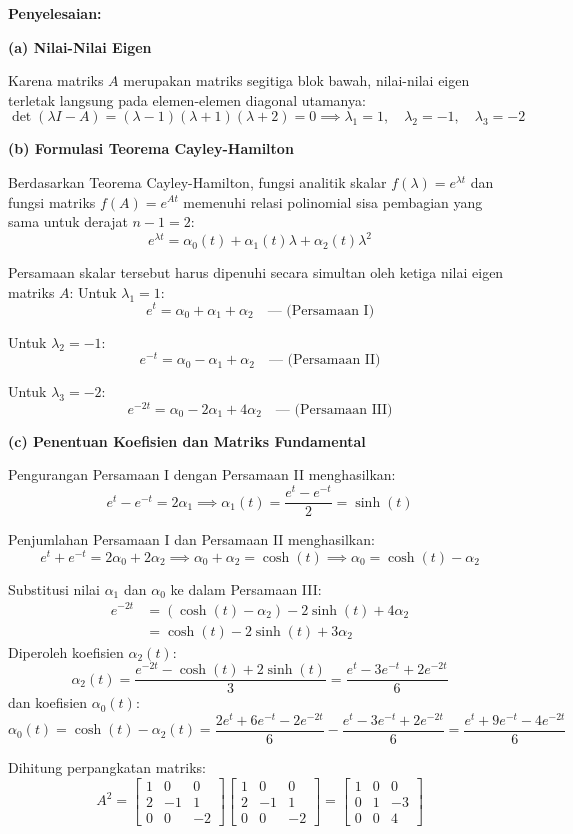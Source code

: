 \documentclass[11pt,a4paper]{article}
\begin{document}
\textbf{Penyelesaian:}

\textbf{(a) Nilai-Nilai Eigen}

Karena matriks $A$ merupakan matriks segitiga blok bawah, nilai-nilai eigen terletak langsung pada elemen-elemen diagonal utamanya:
$$\det(\lambda I - A) = (\lambda - 1)(\lambda + 1)(\lambda + 2) = 0 \implies \lambda_1 = 1, \quad \lambda_2 = -1, \quad \lambda_3 = -2$$

\textbf{(b) Formulasi Teorema Cayley-Hamilton}

Berdasarkan Teorema Cayley-Hamilton, fungsi analitik skalar $f(\lambda) = e^{\lambda t}$ dan fungsi matriks $f(A) = e^{At}$ memenuhi relasi polinomial sisa pembagian yang sama untuk derajat $n-1 = 2$:
$$e^{\lambda t} = \alpha_0(t) + \alpha_1(t)\lambda + \alpha_2(t)\lambda^2$$

Persamaan skalar tersebut harus dipenuhi secara simultan oleh ketiga nilai eigen matriks $A$:
Untuk $\lambda_1 = 1$:
$$e^t = \alpha_0 + \alpha_1 + \alpha_2 \quad \text{--- (Persamaan I)}$$

Untuk $\lambda_2 = -1$:
$$e^{-t} = \alpha_0 - \alpha_1 + \alpha_2 \quad \text{--- (Persamaan II)}$$

Untuk $\lambda_3 = -2$:
$$e^{-2t} = \alpha_0 - 2\alpha_1 + 4\alpha_2 \quad \text{--- (Persamaan III)}$$

\textbf{(c) Penentuan Koefisien dan Matriks Fundamental}

Pengurangan Persamaan I dengan Persamaan II menghasilkan:
$$e^t - e^{-t} = 2\alpha_1 \implies \alpha_1(t) = \frac{e^t - e^{-t}}{2} = \sinh(t)$$

Penjumlahan Persamaan I dan Persamaan II menghasilkan:
$$e^t + e^{-t} = 2\alpha_0 + 2\alpha_2 \implies \alpha_0 + \alpha_2 = \cosh(t) \implies \alpha_0 = \cosh(t) - \alpha_2$$

Substitusi nilai $\alpha_1$ dan $\alpha_0$ ke dalam Persamaan III:
\begin{align*}
    e^{-2t} &= (\cosh(t) - \alpha_2) - 2\sinh(t) + 4\alpha_2 \\
    &= \cosh(t) - 2\sinh(t) + 3\alpha_2
\end{align*}
Diperoleh koefisien $\alpha_2(t)$:
$$\alpha_2(t) = \frac{e^{-2t} - \cosh(t) + 2\sinh(t)}{3} = \frac{e^t - 3e^{-t} + 2e^{-2t}}{6}$$
dan koefisien $\alpha_0(t)$:
$$\alpha_0(t) = \cosh(t) - \alpha_2(t) = \frac{2e^t + 6e^{-t} - 2e^{-2t}}{6} - \frac{e^t - 3e^{-t} + 2e^{-2t}}{6} = \frac{e^t + 9e^{-t} - 4e^{-2t}}{6}$$

Dihitung perpangkatan matriks:
$$A^2 = \begin{bmatrix} 1 & 0 & 0 \\ 2 & -1 & 1 \\ 0 & 0 & -2 \end{bmatrix} \begin{bmatrix} 1 & 0 & 0 \\ 2 & -1 & 1 \\ 0 & 0 & -2 \end{bmatrix} = \begin{bmatrix} 1 & 0 & 0 \\ 0 & 1 & -3 \\ 0 & 0 & 4 \end{bmatrix}$$
\end{document}
